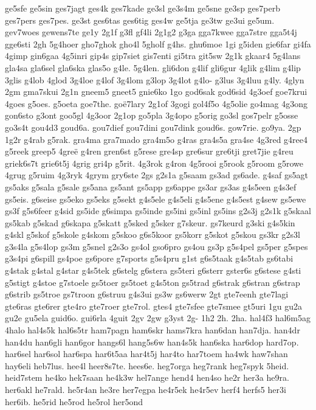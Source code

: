 {ge5sfe
ge5sin
ges7jagt
ges4k
ges7kade
ge3sl
ge3s4m
ge5sne
ge3sp
ges7perb
ges7pers
ges7pes.
ge3st
ges6tas
ges6tig
ges4w
ge5tja
ge3tw
ge3ui
ge5um.
gev7woes
gewens7te
ge1y
2g1f
g3fl
gf4li
2g1g2
g3ga
gga7kwee
gga7stre
gga5t4j
gge6sti
2gh
5g4hoer
gho7ghok
gho4l
5gholf
g4hs.
ghu6moe
1gi
g5iden
gie6far
gi4fa
4gimp
gin6gaa
4g5inri
gip4s
gip7siet
gis7enti
gi5tra
git5sw
2g1k
gkaar4
5g4lans
gla4sa
gla6sel
gla6ska
glas5o
g4le.
5g4len.
gli6don
g4lif
gli6gur
4glik
g4lim
g4lip
3glis
g4lob
4glod
3g4loe
g4lof
3g4lom
g3lop
3g4lot
g4lo-
g3lus
3g4luu
g4ly.
4glyn
2gm
gma7skui
2g1n
gneem5
gneet5
gnie6ko
1go
god6sak
god6sid
4g3oef
goe7krui
4goes
g5oes.
g5oeta
goe7the.
goë7lary
2g1of
3gogi
gol4f5o
4g5olie
go4mag
4g3ong
gon6sto
g3ont
goo5gl
4g3oor
2g1op
go5pla
3g4opo
g5orig
go3sl
gos7pelr
g5osse
go3s4t
gou4d3
goud6a.
gou7dief
gou7dini
gou7dink
goud6s.
gow7rie.
go9ya.
2gp
1g2r
g4rab
g5rak.
gra4ma
gra7mado
gra4m5o
g4ras
gra4s5a
gra4se
4g3red
g4ree4
g5reek
greep5
4greë
g4ren
gren6st
g5rese
gre4sp
gre6sur
gre6tji
gret7jie
g4reu
griek6s7t
grie6t5j
4grig
gri4p
g5rit.
4g3rok
g4ron
4g5rooi
g5rook
g5room
g5rowe
4grug
g5ruim
4g3ryk
4grym
gry6ste
2gs
g2s1a
g5saam
gs3ad
gs6ade.
g4saf
gs5agt
gs5aks
g5sala
g5sale
gs5ana
gs5ant
gs5app
gs6appe
gs3ar
gs3as
g4s5een
g4s3ef
gs5eis.
g6seise
gs5eko
gs5eks
g5sekt
g4s5ele
g4s5eli
g4s5ene
g4s5est
g4sew
gs5ewe
gs3f
g5s6feer
g4sid
gs5ide
g6simpa
gs5inde
gs5ini
gs5inl
gs5ins
g2s3j
g2s1k
g5skaal
gs5kab
g5skad
g6skapa
g5skatt
g5sked
g5sker
g7skeur.
gs7keurd
g3ski
g4s5kin
g4skl
g5skof
g5skole
g4skom
g5skoo
g6s5koor
gs5korr
g5skot
g5skou
gs3kr
g2s3l
g3s4la
g5s4lop
gs3m
g5snel
g2s3o
gs4ol
gso6pro
gs4ou
gs3p
g5s4pel
gs5per
g5spes
g3s4pi
g6spill
gs4poe
gs6pore
g7sports
g5s4pru
g1st
g6s5taak
g4s5tab
gs6tabi
g4stak
g4stal
g4star
g4s5tek
g6stelg
g6stera
gs5teri
g6sterr
gster6s
g6stese
g4sti
g5stigt
g4stoe
g7stoele
gs5toer
gs5toet
g4s5ton
gs5trad
g6strak
g6stran
g6strap
g6strib
gs5troe
gs7troon
g6struu
g4s3ui
gs3w
gs6werw
2gt
gte7eenh
gte7lagi
gte6ras
gte6rer
gte4ro
gte7roer
gte7rol.
gtes4
gte7sfee
gte7smee
gt5uri
1gu
gu2a
gu2e
gu5ela
guid6o.
gui6rla
4guit
2gv
2gw
g3yst
2g-
1h2
2h.
2ha.
hal4f3
hal6m5ag
4halo
hal4s5k
hal6s5tr
ham7pagn
ham6skr
hams7kra
han6dan
han7dja.
han4dr
han4du
han6gli
han6gor
hangs6l
hang5s6w
han4s5k
han6ska
har6dop
hard7op.
har6sel
har6sol
har6spa
har6t5aa
har4t5j
har4to
har7toem
ha4wk
haw7shan
hay6eli
heb7lus.
hee4l
heer8s7te.
hees6e.
heg7orga
heg7rank
heg7spyk
5heid.
heid7stem
he4ko
hek7saan
he4k3w
hel7ange
hend4
hen4so
he2r
her3a
he9ra.
her6akl
he7rald.
he5r4an
he3re
her7egpa
he4r5ek
he4r5ev
herf4
herfs5
her3i
her6ib.
he5rid
he5rod
he5rol
her5ond
}
